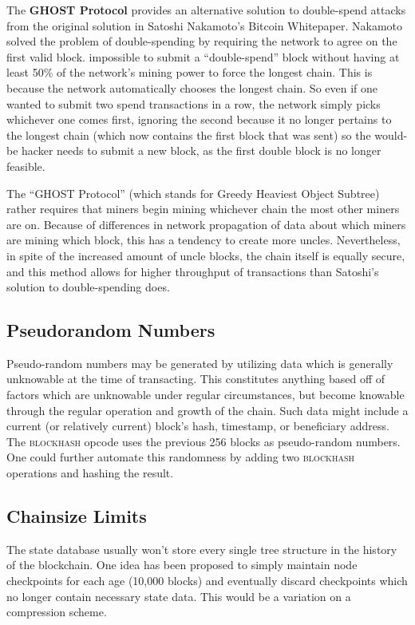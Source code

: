 \documentclass[10pt,letterpaper,leqno,bibliography=totoc]{scrartcl}
\newenvironment{alphafootnotes}
{\par\edef\savedfootnotenumber{\number\value{footnote}}
\renewcommand{\thefootnote}{\alph{footnote}}
\setcounter{footnote}{0}}
{\par\setcounter{footnote}{\savedfootnotenumber}}
\begin{document}
\begin{alphafootnotes}
\begin{multicols*}{2}
			The \textbf{GHOST Protocol} provides an alternative solution to double-spend attacks from the original solution in Satoshi Nakamoto's Bitcoin Whitepaper. Nakamoto solved the problem of double-spending by requiring the network to agree on the first valid block.  impossible to submit a ``double-spend''  block without  having at least 50\% of the network's mining power to force the longest chain. This is because the network automatically chooses the longest chain. So even if one wanted to  submit two spend transactions in a row, the network simply picks whichever one comes first, ignoring the second because it no longer pertains to the longest chain (which now contains the first block that was sent) so the would-be hacker needs to submit a new block, as the first double block is no longer feasible.\par

		The ``GHOST Protocol'' (which stands for Greedy Heaviest Object Subtree) rather requires that miners begin mining whichever chain the most other miners are on. Because of differences in network propagation of data about which miners are mining which block, this has a tendency to create more uncles. Nevertheless, in spite of the increased amount of uncle blocks, the chain itself is equally secure, and this method allows for higher throughput of transactions than Satoshi's solution to double-spending does.

		\subsection{Pseudorandom Numbers} Pseudo-random numbers may be generated by utilizing data which is generally unknowable at the time of transacting. This constitutes anything based off of factors which are unknowable under regular circumstances, but become knowable through the regular operation and growth of the chain. Such data might include a current (or relatively current) block’s hash, timestamp, or beneficiary address. The \textsc{blockhash} opcode uses the previous 256 blocks as pseudo-random numbers. One could further automate this randomness by adding two \textsc{blockhash} operations and hashing the result.   
		\subsection{Chainsize Limits} The \gls{state database} usually won't store every single tree structure in the history of the blockchain. One idea has been proposed to simply maintain node checkpoints for each age (10,000 blocks) and eventually discard checkpoints which no longer contain necessary state data. This would be a variation on a compression scheme. \supercite{Wood2017}

\end{multicols*}
\end{alphafootnotes}
\end{document}
